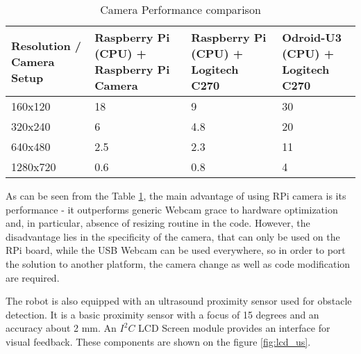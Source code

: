 \begin{table}[h!]
	\setlength\extrarowheight{2pt}
	\setlength\arraycolsep{5pt}
    \begin{tabularx}{\textwidth}{XXXX}
    	\toprule
    	\bf
	    Resolution / Camera Setup & \bf Raspberry Pi (CPU) + Raspberry Pi Camera & \bf 
	    Raspberry Pi (CPU) + Logitech C270 & \bf  Odroid-U3 (CPU) + Logitech C270 \\
	    \hline
	    160x120            & 18           & 9          & 30         \\
	    320x240            & 6            & 4.8        & 20         \\
	    640x480            & 2.5          & 2.3        & 11         \\
	    1280x720           & 0.6          & 0.8        & 4          \\
	    \bottomrule
    \end{tabularx}
    \caption{Camera Performance comparison}
    \label{tab:cam_perf}
\end{table}

As can be seen from the Table \ref{tab:cam_perf}, the main advantage of using
RPi camera is its performance - it outperforms generic Webcam grace to hardware
optimization and, in particular, absence of resizing routine in the code.
However, the disadvantage lies in the specificity of the camera, that can only
be used on the RPi board, while the USB Webcam can be used everywhere, so in
order to port the solution to another platform, the camera change as well as
 code modification are required.

The robot is also equipped with an ultrasound proximity sensor used for obstacle
detection. It is a basic proximity sensor with a focus of 15 degrees and an
accuracy about 2 mm. An $I^2C$ LCD Screen module provides an interface for visual feedback.
These components are shown on the figure \ref{fig:lcd_us}.